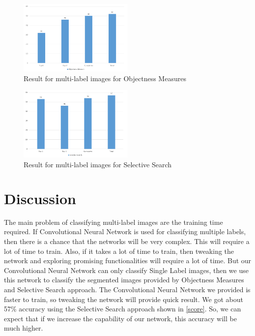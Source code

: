 \begin{figure}
  \centering
  \includegraphics[width=0.5\textwidth]{images/Capture3.PNG}
  \caption{Result for multi-label images for Objectness Measures}\label{finobj}
\end{figure}


\begin{figure}
  \centering
  \includegraphics[width=0.5\textwidth]{images/Capture4.PNG}
  \caption {Result for multi-label images for Selective Search}\label{finsel}
\end{figure}

\section{Discussion}

The main problem of classifying multi-label images are the training time required. If Convolutional Neural Network is used for classifying multiple labels, then there is a chance that the networks will be very complex. This will require a lot of time to train. Also, if it takes a lot of time to train, then tweaking the network and exploring promising functionalities will require a lot of time. But our Convolutional Neural Network can only classify Single Label images, then we use this network to classify the segmented images provided by Objectness Measures and Selective Search approach. The Convolutional Neural Network we provided is faster to train, so tweaking the network will provide quick result. We got about 57\% accuracy using the Selective Search approach shown in \ref{score}. So, we can expect that if we increase the capability of our network, this accuracy will be much higher.

